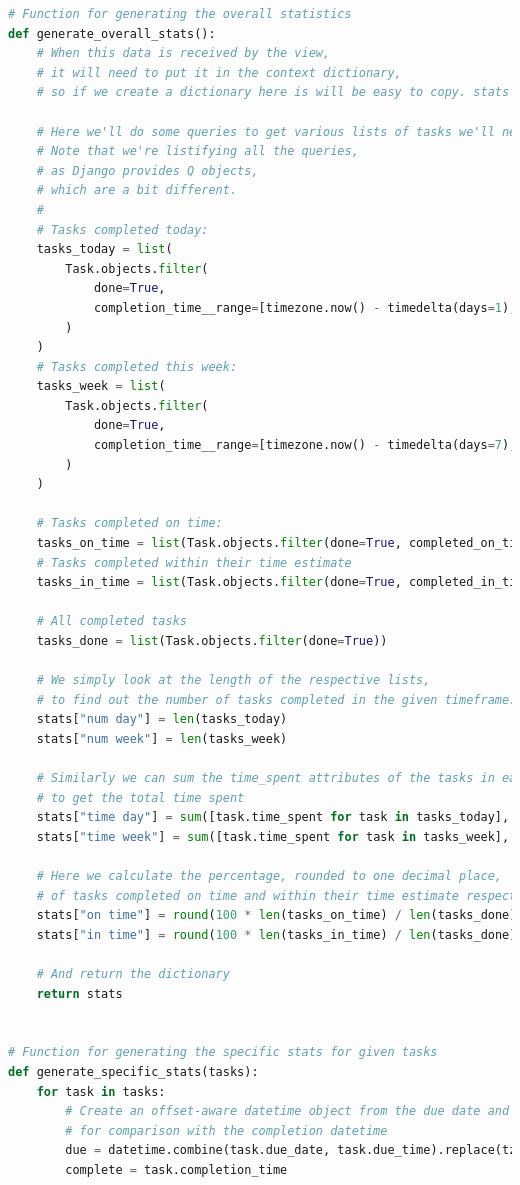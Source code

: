 \documentclass{article}
\begin{document}
\begin{lstlisting}[language=Python]
# Function for generating the overall statistics
def generate_overall_stats():
    # When this data is received by the view,
    # it will need to put it in the context dictionary,
    # so if we create a dictionary here is will be easy to copy. stats = {}

    # Here we'll do some queries to get various lists of tasks we'll need.
    # Note that we're listifying all the queries,
    # as Django provides Q objects,
    # which are a bit different.
    #
    # Tasks completed today:
    tasks_today = list(
        Task.objects.filter(
            done=True,
            completion_time__range=[timezone.now() - timedelta(days=1), timezone.now()],
        )
    )
    # Tasks completed this week:
    tasks_week = list(
        Task.objects.filter(
            done=True,
            completion_time__range=[timezone.now() - timedelta(days=7), timezone.now()],
        )
    )

    # Tasks completed on time:
    tasks_on_time = list(Task.objects.filter(done=True, completed_on_time=True))
    # Tasks completed within their time estimate
    tasks_in_time = list(Task.objects.filter(done=True, completed_in_time=True))

    # All completed tasks
    tasks_done = list(Task.objects.filter(done=True))

    # We simply look at the length of the respective lists,
    # to find out the number of tasks completed in the given timeframe.
    stats["num day"] = len(tasks_today)
    stats["num week"] = len(tasks_week)

    # Similarly we can sum the time_spent attributes of the tasks in each list,
    # to get the total time spent
    stats["time day"] = sum([task.time_spent for task in tasks_today], timedelta())
    stats["time week"] = sum([task.time_spent for task in tasks_week], timedelta())

    # Here we calculate the percentage, rounded to one decimal place,
    # of tasks completed on time and within their time estimate respectively
    stats["on time"] = round(100 * len(tasks_on_time) / len(tasks_done), 1)
    stats["in time"] = round(100 * len(tasks_in_time) / len(tasks_done), 1)

    # And return the dictionary
    return stats


# Function for generating the specific stats for given tasks
def generate_specific_stats(tasks):
    for task in tasks:
        # Create an offset-aware datetime object from the due date and due time,
        # for comparison with the completion datetime
        due = datetime.combine(task.due_date, task.due_time).replace(tzinfo=pytz.UTC)
        complete = task.completion_time


\end{lstlisting}
\end{document}
